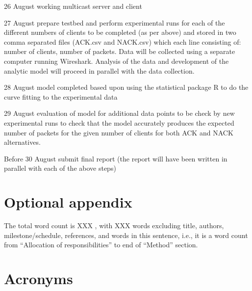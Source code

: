 \documentclass[12pt,twoside,english]{article}
\begin{document}
\begin{description}
\item{26 August} working multicast server and client

\item{27 August} prepare testbed and perform experimental runs for each of the
  different numbers of clients to be completed (as per above) and stored in
  two comma separated files (ACK.csv and NACK.csv) which each line consisting
  of: number of clients, number of packets. Data will be collected using a
  separate computer running Wireshark. Analysis of the data and development of
  the analytic model will proceed in parallel with the data collection.

\item{28 August} model completed based upon using the statistical package R to do the curve fitting to the experimental data

\item{29 August} evaluation of model for additional data points to be check by new experimental runs to check that the model accurately produces the expected number of packets for the given number of clients for both \gls{ACK} and \gls{NACK} alternatives.

\item{Before 30 August} submit final report (the report will have been written in parallel with each of the above steps)
\end{description}




\appendix
\section{Optional appendix}


The total word count is XXX , with XXX words excluding title, authors, milestone/schedule, references, and words in this sentence, i.e., it is a word count from “Allocation of responsibilities” to end of “Method” section.

\section{Acronyms}
\renewcommand{\glossarysection}[2][]{} %
\printglossary[type=\acronymtype,nonumberlist]
\clearpage
\end{document}
